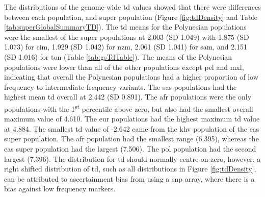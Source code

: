 \documentclass[]{report}
\begin{document}
The distributions of the genome-wide \gls{td} values showed that there
were differences between each population, and super population (Figure
\ref{fig:tdDensity} and Table \ref{tab:superGlobalSummaryTD}). The
\gls{td} means for the Polynesian populations were the smallest of the
super populations at 2.003 (SD 1.049) with 1.875 (SD 1.073) for
\gls{cim}, 1.929 (SD 1.042) for \gls{nzm}, 2.061 (SD 1.041) for
\gls{sam}, and 2.151 (SD 1.016) for \gls{ton} (Table
\ref{tab:gsTdTable}). The means of the Polynesian populations were lower
than all of the other populations except \gls{pel} and \gls{mxl},
indicating that overall the Polynesian populations had a higher
proportion of low frequency to intermediate frequency variants. The
\gls{sas} populations had the highest mean \gls{td} overall at 2.442 (SD
0.891). The \gls{afr} populations were the only populations with the
1\textsuperscript{st} percentile above zero, but also had the smallest
overall maximum value of 4.610. The \gls{eur} populations had the
highest maximum \gls{td} value at 4.884. The smallest \gls{td} value of
-2.642 came from the \gls{khv} population of the \gls{eas} super
population. The \gls{afr} population had the smallest range (6.395),
whereas the \gls{eas} super population had the largest (7.506). The
\gls{pol} population had the second largest (7.396). The distribution
for \gls{td} should normally centre on zero, however, a right shifted
distribution of \gls{td}, such as all distributions in Figure
\ref{fig:tdDensity}, can be attributed to ascertainment bias from using
a \gls{snp} array, where there is a bias against low frequency markers.

\begin{table}

\caption{\label{tab:unnamed-chunk-5}\label{tab:superGlobalSummaryTD} Summary statistics for \gls{td} by super population.}
\centering
{}
\end{table}
\end{document}
